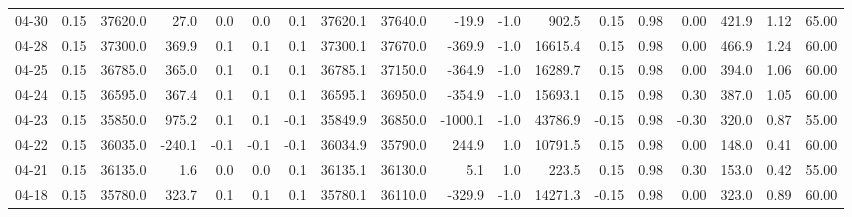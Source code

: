 \begin{threeparttable}
{\begin{tabular}{lrrrrrrrrrrrrrrrrr}
  04-30 &     0.15 & 37620.0 &              27.0 &               0.0 &                0.0 &                0.1 & 37620.1 & 37640.0 &      -19.9 &                     -1.0 &               902.5 &       0.15 &      0.98 &           0.00 &            421.9 &            1.12 &                  65.00 \\
  04-28 &     0.15 & 37300.0 &             369.9 &               0.1 &                0.1 &                0.1 & 37300.1 & 37670.0 &     -369.9 &                     -1.0 &             16615.4 &       0.15 &      0.98 &           0.00 &            466.9 &            1.24 &                  60.00 \\
  04-25 &     0.15 & 36785.0 &             365.0 &               0.1 &                0.1 &                0.1 & 36785.1 & 37150.0 &     -364.9 &                     -1.0 &             16289.7 &       0.15 &      0.98 &           0.00 &            394.0 &            1.06 &                  60.00 \\
  04-24 &     0.15 & 36595.0 &             367.4 &               0.1 &                0.1 &                0.1 & 36595.1 & 36950.0 &     -354.9 &                     -1.0 &             15693.1 &       0.15 &      0.98 &           0.30 &            387.0 &            1.05 &                  60.00 \\
  04-23 &     0.15 & 35850.0 &             975.2 &               0.1 &                0.1 &               -0.1 & 35849.9 & 36850.0 &    -1000.1 &                     -1.0 &             43786.9 &      -0.15 &      0.98 &          -0.30 &            320.0 &            0.87 &                  55.00 \\
  04-22 &     0.15 & 36035.0 &            -240.1 &              -0.1 &               -0.1 &               -0.1 & 36034.9 & 35790.0 &      244.9 &                      1.0 &             10791.5 &       0.15 &      0.98 &           0.00 &            148.0 &            0.41 &                  60.00 \\
  04-21 &     0.15 & 36135.0 &               1.6 &               0.0 &                0.0 &                0.1 & 36135.1 & 36130.0 &        5.1 &                      1.0 &               223.5 &       0.15 &      0.98 &           0.30 &            153.0 &            0.42 &                  55.00 \\
  04-18 &     0.15 & 35780.0 &             323.7 &               0.1 &                0.1 &                0.1 & 35780.1 & 36110.0 &     -329.9 &                     -1.0 &             14271.3 &      -0.15 &      0.98 &           0.00 &            323.0 &            0.89 &                  60.00 \\

\end{tabular}}
\end{threeparttable}
